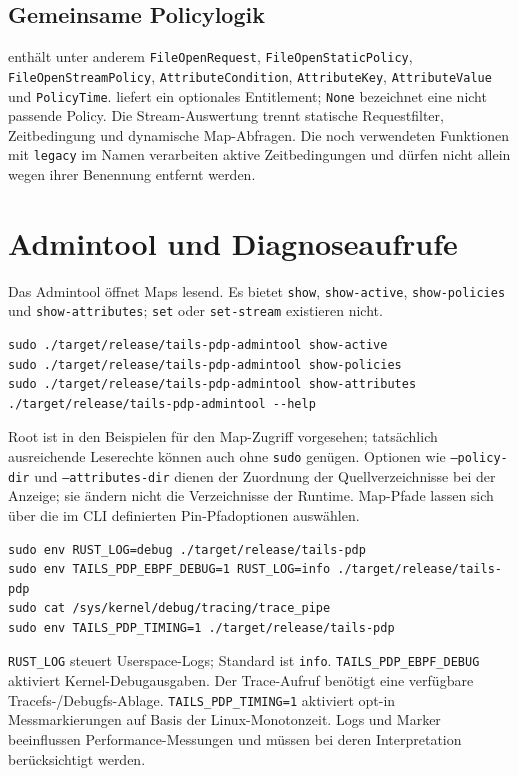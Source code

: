 \documentclass[12pt,a4paper]{article}
\begin{document}
\subsection{Gemeinsame Policylogik}
 enthält unter anderem
\texttt{FileOpenRequest}, \texttt{FileOpenStaticPolicy},
\texttt{FileOpenStreamPolicy}, \texttt{AttributeCondition}, \texttt{AttributeKey},
\texttt{AttributeValue} und \texttt{PolicyTime}.
 liefert ein optionales Entitlement;
\texttt{None} bezeichnet eine nicht passende Policy. Die Stream-Auswertung trennt
statische Requestfilter, Zeitbedingung und dynamische Map-Abfragen.
Die noch verwendeten Funktionen mit \texttt{legacy} im Namen verarbeiten aktive
Zeitbedingungen und dürfen nicht allein wegen ihrer Benennung entfernt werden.

\section{Admintool und Diagnoseaufrufe}
Das Admintool öffnet Maps lesend. Es bietet \texttt{show}, \texttt{show-active},
\texttt{show-policies} und \texttt{show-attributes}; \texttt{set} oder
\texttt{set-stream} existieren nicht.
\begin{lstlisting}
sudo ./target/release/tails-pdp-admintool show-active
sudo ./target/release/tails-pdp-admintool show-policies
sudo ./target/release/tails-pdp-admintool show-attributes
./target/release/tails-pdp-admintool --help
\end{lstlisting}
Root ist in den Beispielen für den Map-Zugriff vorgesehen; tatsächlich ausreichende
Leserechte können auch ohne \texttt{sudo} genügen. Optionen wie
\texttt{--policy-dir} und \texttt{--attributes-dir} dienen der Zuordnung der
Quellverzeichnisse bei der Anzeige; sie ändern nicht die Verzeichnisse der Runtime.
Map-Pfade lassen sich über die im CLI definierten Pin-Pfadoptionen auswählen.

\begin{lstlisting}
sudo env RUST_LOG=debug ./target/release/tails-pdp
sudo env TAILS_PDP_EBPF_DEBUG=1 RUST_LOG=info ./target/release/tails-pdp
sudo cat /sys/kernel/debug/tracing/trace_pipe
sudo env TAILS_PDP_TIMING=1 ./target/release/tails-pdp
\end{lstlisting}
\texttt{RUST\_LOG} steuert Userspace-Logs; Standard ist \texttt{info}.
\texttt{TAILS\_PDP\_EBPF\_DEBUG} aktiviert Kernel-Debugausgaben.
Der Trace-Aufruf benötigt eine verfügbare Tracefs-/Debugfs-Ablage.
\texttt{TAILS\_PDP\_TIMING=1} aktiviert opt-in Messmarkierungen auf Basis der
Linux-Monotonzeit. Logs und Marker beeinflussen Performance-Messungen und müssen
bei deren Interpretation berücksichtigt werden.
\end{document}
